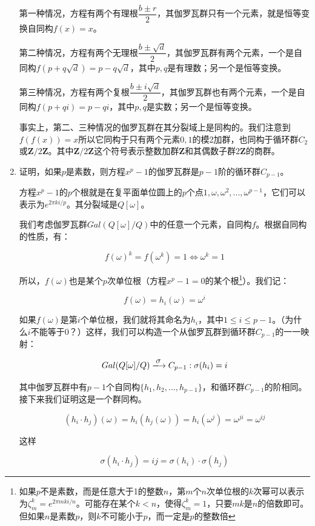 \documentclass[UTF8]{article}
\begin{document}
\begin{enumerate}
第一种情况，方程有两个有理根$\dfrac{b \pm r}{2}$，其伽罗瓦群只有一个元素，就是恒等变换自同构$f(x) = x$。

第二种情况，方程有两个无理根$\dfrac{b \pm \sqrt{d}}{2}$，其伽罗瓦群有两个元素，一个是自同构$f(p + q \sqrt{d}) = p - q \sqrt{d}$，其中$p, q$是有理数；另一个是恒等变换。

第三种情况，方程有两个复根$\dfrac{b \pm i \sqrt{d}}{2}$，其伽罗瓦群也有两个元素，一个是自同构$f(p + q i) = p - q i$，其中$p, q$是实数；另一个是恒等变换。

事实上，第二、三种情况的伽罗瓦群在其分裂域上是同构的。我们注意到$f(f(x)) = x$所以它同构于只有两个元素${0, 1}$的模2加群，也同构于循环群$C_2$或$\pmb{Z}/2\pmb{Z}$。其中$\pmb{Z}/2\pmb{Z}$这个符号表示整数加群$\pmb{Z}$和其偶数子群$2\pmb{Z}$的商群。

\item {证明，如果$p$是素数，则方程$x^p - 1$的伽罗瓦群是$p-1$阶的循环群$C_{p-1}$。}

方程$x^p -1$的$p$个根就是在复平面单位圆上的$p$个点$1, \omega, \omega^2, ..., \omega^{p-1}$，它们可以表示为$e^{2 \pi k i / p}$。其分裂域是$Q[\omega]$。

我们考虑伽罗瓦群$Gal(Q[\omega]/Q)$中的任意一个元素，自同构$f$。根据自同构的性质，有：

\[
f(\omega)^k = f(\omega^k) = 1 \iff \omega^k = 1
\]

所以，$f(\omega)$也是某个$p$次单位根（方程$x^p - 1 = 0$的某个根\footnote{如果$p$不是素数，而是任意大于1的整数$n$，第$m$个$n$次单位根的$k$次幂可以表示为$\zeta_m^k = e^{2 \pi m k i / n}$。可能存在某个$k < n$，使得$\zeta_m^k = 1$，只要$mk$是$n$的倍数即可。但如果$n$是素数$p$，则$k$不可能小于$p$，而一定是$p$的整数倍}）。我们记：

\[
f(\omega) = h_i(\omega) = \omega^{i}
\]

如果$f(\omega)$是第$i$个单位根，我们就将其命名为$h_i$，其中$1 \leq i \leq p-1$。（为什么$i$不能等于0？）这样，我们可以构造一个从伽罗瓦群到循环群$C_{p-1}$的一一映射：

\[
Gal(Q[\omega]/Q) \arrowto{\sigma} C_{p-1} :  \sigma(h_i) = i
\]

其中伽罗瓦群中有$p-1$个自同构$\{h_1, h_2, ..., h_{p-1}\}$，和循环群$C_{p-1}$的阶相同。
接下来我们证明这是一个群同构。

\[
(h_i \cdot h_j)(\omega) = h_i(h_j(\omega)) = h_i(\omega^j) = \omega^{ji} = \omega^{ij}
\]

这样

\[
\sigma(h_i \cdot h_j) = ij = \sigma(h_i) \cdot \sigma(h_j)
\]


\end{enumerate}
\end{document}
